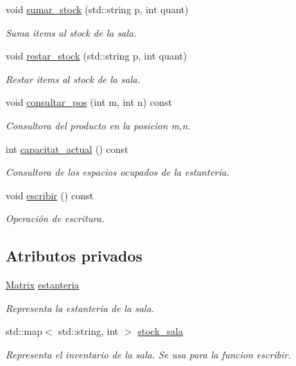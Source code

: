 \begin{DoxyCompactItemize}
void \mbox{\hyperlink{class_sala_a91e0acab4f56f3a5cbcad80afe163de8}{sumar\+\_\+stock}} (std\+::string p, int quant)
\begin{DoxyCompactList}\small\item\em Suma items al stock de la sala. \end{DoxyCompactList}\item 
void \mbox{\hyperlink{class_sala_a3f2485d40f7d90ca5eb8142dbadd5993}{restar\+\_\+stock}} (std\+::string p, int quant)
\begin{DoxyCompactList}\small\item\em Restar items al stock de la sala. \end{DoxyCompactList}\item 
void \mbox{\hyperlink{class_sala_a611c18b0ebd5fd9c8ec386809b363d50}{consultar\+\_\+pos}} (int m, int n) const
\begin{DoxyCompactList}\small\item\em Consultora del producto en la posicion m,n. \end{DoxyCompactList}\item 
int \mbox{\hyperlink{class_sala_ac1bcf6e4f9a336b505a362468411af20}{capacitat\+\_\+actual}} () const
\begin{DoxyCompactList}\small\item\em Consultora de los espacios ocupados de la estanteria. \end{DoxyCompactList}\item 
void \mbox{\hyperlink{class_sala_a972a0cf004635c588343ddad949282e0}{escribir}} () const
\begin{DoxyCompactList}\small\item\em Operación de escritura. \end{DoxyCompactList}\end{DoxyCompactItemize}
\subsection*{Atributos privados}
\begin{DoxyCompactItemize}
\item 
\mbox{\hyperlink{almacen_8hh_acdf2b2dca71b1d617c96d1afa6a525fa}{Matrix}} \mbox{\hyperlink{class_sala_a8f5264818c98db9c0d075c51a7672d95}{estanteria}}
\begin{DoxyCompactList}\small\item\em Representa la estanteria de la sala. \end{DoxyCompactList}\item 
std\+::map$<$ std\+::string, int $>$ \mbox{\hyperlink{class_sala_a7c9511997ba4a6fac93625fd3f5c7703}{stock\+\_\+sala}}
\begin{DoxyCompactList}\small\item\em Representa el inventario de la sala. Se usa para la funcion escribir. \end{DoxyCompactList}\end{DoxyCompactItemize}


